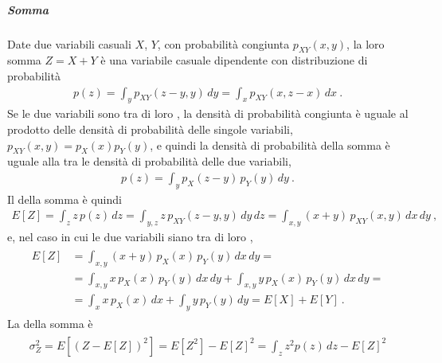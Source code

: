 \documentclass[letterpaper,10pt,italian]{jupyterBook}
\begin{document}
\subparagraph{Somma}
\label{\detokenize{ch/statistics/rv_pdf_transformations:somma}}
\sphinxAtStartPar
Date due variabili casuali \(X\), \(Y\), con probabilità congiunta \(p_{XY}(x,y)\), la loro somma \(Z = X + Y\) è una variabile casuale dipendente con distribuzione di probabilità
\begin{equation*}
\begin{split}p(z) = \int_y p_{XY}(z-y,y) \, dy = \int_{x} p_{XY}(x, z-x) \, dx \ .\end{split}
\end{equation*}
\sphinxAtStartPar
Se le due variabili sono tra di loro , la densità di probabilità congiunta è uguale al prodotto delle densità di probabilità delle singole variabili, \(p_{XY}(x,y) = p_X(x) p_Y(y)\), e quindi la densità di probabilità della somma è uguale alla  tra le densità di probabilità delle due variabili,
\begin{equation*}
\begin{split}p(z) = \int_y p_{X}(z-y) \, p_{Y}(y) \, dy \ .\end{split}
\end{equation*}
\sphinxAtStartPar
Il  della somma è quindi
\begin{equation*}
\begin{split}E[Z] = \int_z z \, p(z) \, dz = \int_{y,z} z \, p_{XY}(z-y,y) \, dy \, dz =  \int_{x,y} (x+y) \, p_{XY}(x,y) \, dx \, dy \ , \end{split}
\end{equation*}
\sphinxAtStartPar
e, nel caso in cui le due variabili siano tra di loro ,
\begin{equation*}
\begin{split}\begin{aligned}
  E[Z]
  & = \int_{x,y} (x + y) \, p_X(x) \, p_Y(y) \, dx \, dy = \\
  & = \int_{x,y} x \, p_X(x) \, p_Y(y) \, dx \, dy + \int_{x,y} y \, p_X(x) \, p_Y(y) \, dx \, dy = \\
  & = \int_x x \, p_X(x) \, dx + \int_y y \, p_Y(y) \, dy = E[X] + E[Y] \ .
\end{aligned}\end{split}
\end{equation*}
\sphinxAtStartPar
La  della somma è
\begin{equation*}
\begin{split}\begin{aligned}
  \sigma_Z^2 = E\left[(Z - E[Z])^2\right] 
  = E\left[Z^2\right] - E[Z]^2
  = \int_z z^2 p(z) \, dz - E[Z]^2
\end{aligned}\end{split}
\end{equation*}
\end{document}
